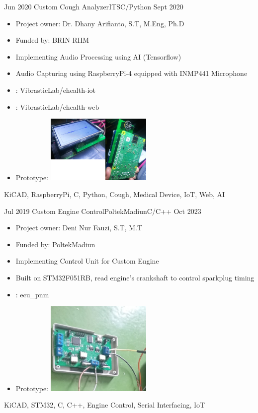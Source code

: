 \begin{experiences}
    \emptySeparator
	\experience
    {Jun 2020} {Custom Cough Analyzer}{ITS}{C/Python}
	{Sept 2020} {
	\begin{itemize}
            \item Project owner: Dr. Dhany Arifianto, S.T, M.Eng, Ph.D
            \item Funded by: BRIN RIIM
	    \item Implementing Audio Processing using AI (Tensorflow)
	    \item Audio Capturing using RaspberryPi-4 equipped with INMP441 Microphone
	    \item \faGithub:  {VibrasticLab/ehealth-iot}
	    \item \faGithub:  {VibrasticLab/ehealth-web}
        \item Prototype: \includegraphics[width=0.4\textwidth]{images/cough.jpg}
	\end{itemize}
    }
    {KiCAD, RaspberryPi, C, Python, Cough, Medical Device, IoT, Web, AI}

    \emptySeparator
    \experience
    {Jul 2019} {Custom Engine Control}{PoltekMadiun}{C/C++}
    {Oct 2023} {
        \begin{itemize}
            \item Project owner: Deni Nur Fauzi, S.T, M.T
            \item Funded by: PoltekMadiun
            \item Implementing Control Unit for Custom Engine
            \item Built on STM32F051RB, read engine's crankshaft to control sparkplug timing
            \item \faGithub:  {ecu\_pnm}
            \item Prototype: \includegraphics[width=0.4\textwidth]{images/ecu_pnm.jpg}
        \end{itemize}
    }
    {KiCAD, STM32, C, C++, Engine Control, Serial Interfacing, IoT}


\end{experiences}
